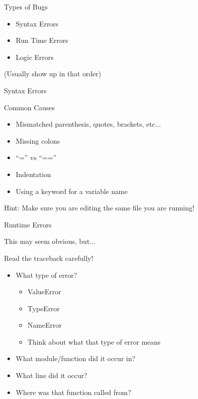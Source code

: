 \documentclass{beamer}
\begin{document}
\begin{frame}[fragile]{Types of Bugs}

{\LARGE

\begin{itemize}
\item Syntax Errors
\item Run Time Errors
\item Logic Errors
\end{itemize}
}

\vfill
(Usually show up in that order)
\end{frame} 

\begin{frame}[fragile]{Syntax Errors}

{\LARGE Common Causes}

\begin{itemize}
\item Mismatched parenthesis, quotes, brackets, etc...
\item Missing colons
\item ``='' vs ``==''
\item Indentation
\item Using a keyword for a variable name
\end{itemize}

\vfill
Hint: Make sure you are editing the same file you are running!
\end{frame} 

\begin{frame}[fragile]{Runtime Errors}

{\LARGE This may seem obvious, but...}

\vfill
{\Large Read the traceback carefully!}

\begin{itemize}
  \item What type of error?
  \begin{itemize}
    \item ValueError
    \item TypeError
    \item NameError
    \item Think about what that type of error means
  \end{itemize}
  \item What module/function did it occur in?
  \item What line did it occur?
  \item Where was that function called from?
\end{itemize}
\end{frame} 
\end{document}
